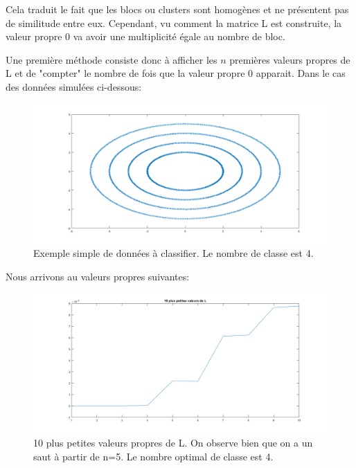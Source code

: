 \medskip

Cela traduit le fait que les blocs ou clusters sont homogènes et ne présentent pas de similitude entre eux. Cependant, vu comment la matrice L est construite, la valeur propre 0 va avoir une multiplicité égale au nombre de bloc.

\medskip

Une première méthode consiste donc à afficher les $n$ premières valeurs propres de L et de "compter" le nombre de fois que la valeur propre 0 apparait. Dans le cas des données simulées ci-dessous:

\medskip

\begin{figure}[H]
\centering
    \includegraphics[scale=0.4,angle=0]{Images/testData.png}
    \caption{Exemple simple de données à classifier. Le nombre de classe est 4.}
    \label{fig:testData}
\end{figure} 

\medskip

Nous arrivons au valeurs propres suivantes:

\medskip

\begin{figure}[H]
\centering
    \includegraphics[scale=0.4,angle=0]{Images/Ngap.png}
    \caption{10 plus petites valeurs propres de L. On observe bien que on a un saut à partir de n=5. Le nombre optimal de classe est 4.}
    \label{fig:Ngap}
\end{figure} 

